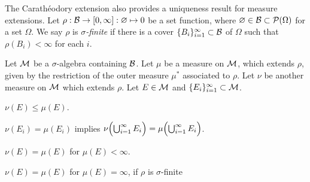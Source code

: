 \documentclass{../../large}
\begin{document}
\begin{prb}
The Carath\'eodory extension also provides a uniqueness result for measure extensions.
Let $\rho:\mathcal{B}\to[0,\infty]:\varnothing\mapsto0$ be a set function, where $\varnothing\in\mathcal{B}\subset\mathcal{P}(\Omega)$ for a set $\Omega$.
We say $\rho$ is \emph{$\sigma$-finite} if there is a cover $\{B_i\}_{i=1}^\infty\subset\mathcal{B}$ of $\Omega$ such that $\rho(B_i)<\infty$ for each $i$.

Let $\mathcal{M}$ be a $\sigma$-algebra containing $\mathcal{B}$.
Let $\mu$ be a measure on $\mathcal{M}$, which extends $\rho$, given by the restriction of the outer measure $\mu^*$ associated to $\rho$.
Let $\nu$ be another measure on $\mathcal{M}$ which extends $\rho$.
Let $E\in\mathcal{M}$ and $\{E_i\}_{i=1}^\infty\subset\mathcal{M}$.
\begin{parts}
\item $\nu(E)\le\mu(E)$.
\item $\nu(E_i)=\mu(E_i)$ implies $\nu\Bigl(\bigcup_{i=1}^\infty E_i\Bigr)=\mu\Bigl(\bigcup_{i=1}^\infty E_i\Bigr)$.
\item $\nu(E)=\mu(E)$ for $\mu(E)<\infty$.
\item $\nu(E)=\mu(E)$ for $\mu(E)=\infty$, if $\rho$ is $\sigma$-finite
\end{parts}
\end{prb}
\end{document}
